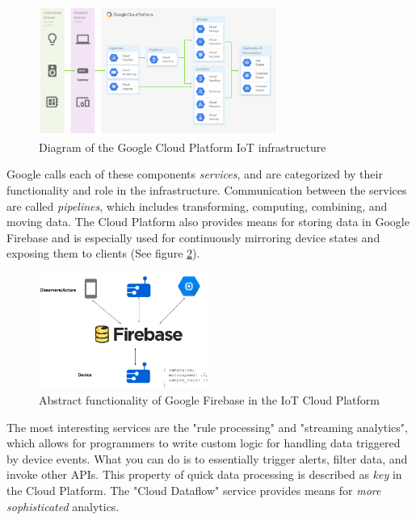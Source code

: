 \begin{figure}[h!]
	\centering
	\includegraphics[width=0.7\textwidth]{figures/gcp/infrastructure.png}
	\caption{Diagram of the Google Cloud Platform IoT infrastructure}
	\label{fig:gcp:infrastructure}
\end{figure}

Google calls each of these components \textit{services}, and are categorized by their functionality and role in the infrastructure. Communication between the services are called \textit{pipelines}, which includes transforming, computing, combining, and moving data. The Cloud Platform also provides means for storing data in Google Firebase\cite{website:firebase}
and is especially used for continuously mirroring device states and exposing them to clients (See figure \ref{fig:gcp:firebase}).

\begin{figure}[h!]
	\centering
	\includegraphics[width=0.5\textwidth]{figures/gcp/firebase.png}
	\caption{Abstract functionality of Google Firebase in the IoT Cloud Platform}
	\label{fig:gcp:firebase}
\end{figure}

The most interesting services are the "rule processing" and "streaming analytics", which allows for programmers to write custom logic for handling data triggered by device events. What you can do is to essentially trigger alerts, filter data, and invoke other APIs. This property of quick data processing is described as \textit{key} in the Cloud Platform. The "Cloud Dataflow" service provides means for \textit{more sophisticated} analytics. 

